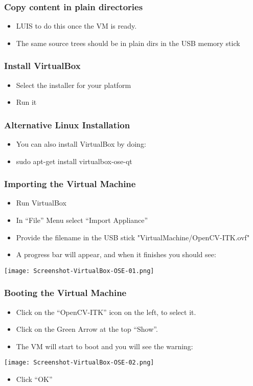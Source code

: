 \begin{frame}
\frametitle{Copy content in plain directories}
\begin{itemize}
\item LUIS to do this once the VM is ready.
\item The same source trees should be in plain dirs in the USB memory stick
\end{itemize}
\end{frame}

\begin{frame}
\frametitle{Install VirtualBox}
\begin{itemize}
\item Select the installer for your platform
\item Run it
\end{itemize}
\end{frame}

\begin{frame}
\frametitle{Alternative Linux Installation}
\begin{itemize}
\item  You can also install VirtualBox by doing:
\item  sudo apt-get install virtualbox-ose-qt
\end{itemize}
\end{frame}

\begin{frame}
\frametitle{Importing the Virtual Machine}
\begin{itemize}
\item Run VirtualBox
\item In ``File'' Menu select ``Import Appliance''
\item Provide the filename in the USB stick "VirtualMachine/OpenCV-ITK.ovf"
\item A progress bar will appear, and when it finishes you should see:
\end{itemize}
\begin{center}
  \texttt{[image: Screenshot-VirtualBox-OSE-01.png]}
\end{center}
\end{frame}

\begin{frame}
\frametitle{Booting the Virtual Machine}
\begin{itemize}
\item Click on the ``OpenCV-ITK'' icon on the left, to select it.
\item Click on the Green Arrow at the top ``Show''.
\item The VM will start to boot and you will see the warning:
\end{itemize}
\begin{center}
  \texttt{[image: Screenshot-VirtualBox-OSE-02.png]}
\end{center}
\begin{itemize}
\item Click ``OK''
\end{itemize}
\end{frame}

